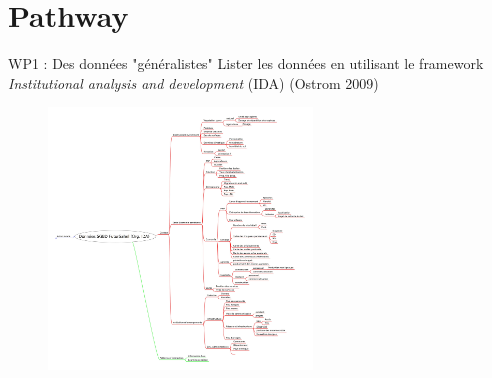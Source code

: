 \documentclass[newPxFont]{beamer}
\begin{document}

\section{Pathway}


\begin{frame}[c]{WP1 : Des données "généralistes"}
\vspace{-2em}
Lister les données en utilisant le framework \textit{Institutional analysis and development} (IDA) (Ostrom 2009)
\vspace{-1em}
\begin{figure}
	\centering
	\includegraphics[width = 7cm]{img/IDA_data_org}
\end{figure}
\end{frame}

\end{document}
